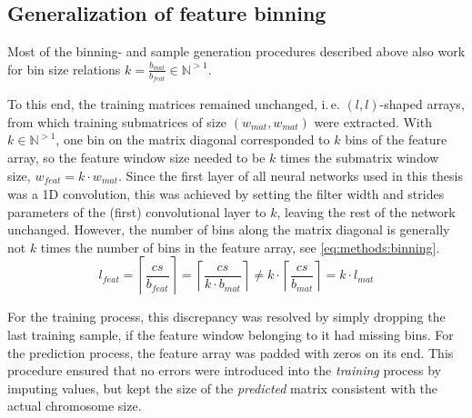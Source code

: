 \subsection{Generalization of feature binning} \label{sec:methods:inputBinning}
Most of the binning- and sample generation procedures described above 
also work for bin size relations $k=\frac{b_\mathit{mat}}{b_\mathit{feat}} \in \mathbb{N}^{>1}$.

To this end, the training matrices remained unchanged, i.\,e. $(l, l)$-shaped arrays, from which training submatrices of size  $(w_\mathit{mat}, w_\mathit{mat})$
were extracted. 
With $k \in \mathbb{N}^{>1}$, one bin on the matrix diagonal corresponded to $k$ bins of the feature array,
so the feature window size needed to be $k$ times the submatrix window size, $w_\mathit{feat} = k \cdot w_\mathit{mat}$.
Since the first layer of all neural networks used in this thesis was a 1D convolution,
this was achieved by setting the filter width and strides parameters of the (first) convolutional layer to $k$, leaving the rest of the network unchanged.
However, the number of bins along the matrix diagonal is generally not $k$ times the number of bins in the feature array,
see \cref{eq:methods:binning}.
\begin{equation}
 l_\mathit{feat} = \left \lceil{\frac{cs}{b_\mathit{feat}}}\right \rceil
                = \left \lceil{\frac{cs}{k \cdot b_\mathit{mat}}}\right \rceil 
                \not = k \cdot \left \lceil{\frac{cs}{ b_\mathit{mat}}}\right \rceil
                = k \cdot l_\mathit{mat} \label{eq:methods:binning}
\end{equation}

For the training process, this discrepancy was resolved by simply dropping the last training sample, 
if the feature window belonging to it had missing bins.
For the prediction process, the feature array was padded with zeros on its end.
This procedure ensured that no errors were introduced into the \emph{training} process by imputing values,
but kept the size of the \emph{predicted} matrix consistent with the actual chromosome size.

